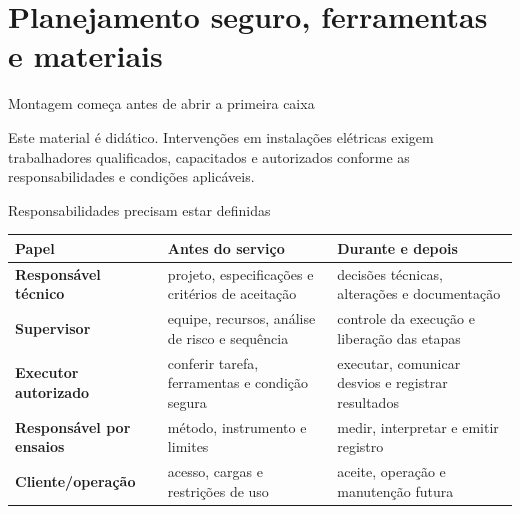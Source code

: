 
\section{Planejamento seguro, ferramentas e materiais}

\begin{frame}{Montagem começa antes de abrir a primeira caixa}
\centering
{}
\vspace{5mm}
\begin{caixaAt}
Este material é didático. Intervenções em instalações elétricas exigem trabalhadores qualificados, capacitados e autorizados conforme as responsabilidades e condições aplicáveis.
\end{caixaAt}
\end{frame}

\begin{frame}{Responsabilidades precisam estar definidas}
\small
\begin{tabularx}{\textwidth}{>{\bfseries}p{2.9cm}X X}
\toprule
Papel & Antes do serviço & Durante e depois \\
\midrule
Responsável técnico & projeto, especificações e critérios de aceitação & decisões técnicas, alterações e documentação \\
Supervisor & equipe, recursos, análise de risco e sequência & controle da execução e liberação das etapas \\
Executor autorizado & conferir tarefa, ferramentas e condição segura & executar, comunicar desvios e registrar resultados \\
Responsável por ensaios & método, instrumento e limites & medir, interpretar e emitir registro \\
Cliente/operação & acesso, cargas e restrições de uso & aceite, operação e manutenção futura \\
\bottomrule
\end{tabularx}
\end{frame}


